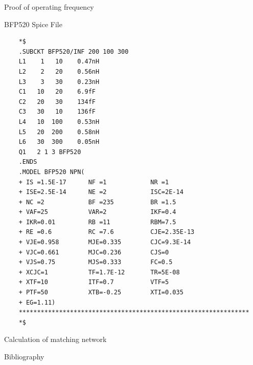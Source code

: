 \documentclass{beamer}
\begin{document}
\begin{frame}{Proof of operating frequency}

\end{frame}

\begin{frame}[fragile]{BFP520 Spice File}
\begin{tiny}
  \begin{lstlisting}
    *$
    .SUBCKT BFP520/INF 200 100 300
    L1    1   10    0.47nH
    L2    2   20    0.56nH
    L3    3   30    0.23nH
    C1   10   20    6.9fF
    C2   20   30    134fF
    C3   30   10    136fF
    L4   10  100    0.53nH
    L5   20  200    0.58nH
    L6   30  300    0.05nH
    Q1   2 1 3 BFP520
    .ENDS
    .MODEL BFP520 NPN(
    + IS =1.5E-17      NF =1            NR =1
    + ISE=2.5E-14      NE =2            ISC=2E-14
    + NC =2            BF =235          BR =1.5
    + VAF=25           VAR=2            IKF=0.4
    + IKR=0.01         RB =11           RBM=7.5
    + RE =0.6          RC =7.6          CJE=2.35E-13
    + VJE=0.958        MJE=0.335        CJC=9.3E-14
    + VJC=0.661        MJC=0.236        CJS=0
    + VJS=0.75         MJS=0.333        FC=0.5
    + XCJC=1           TF=1.7E-12       TR=5E-08
    + XTF=10           ITF=0.7          VTF=5
    + PTF=50           XTB=-0.25        XTI=0.035
    + EG=1.11)
    ***************************************************************
    *$
  \end{lstlisting}
\end{tiny}

\end{frame}

\begin{frame}{Calculation of matching network}

\end{frame}


\begin{frame}{Bibliography}

\end{frame}
\end{document}
